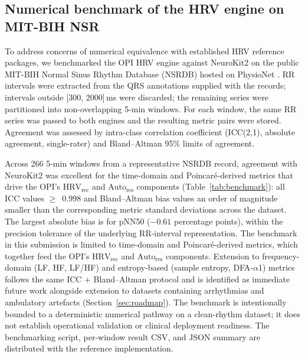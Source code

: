 \documentclass[10pt,journal,twocolumn,compsoc]{IEEEtran}
\begin{document}
\subsection{Numerical benchmark of the HRV engine on MIT-BIH NSR}
\label{sec:benchmark}

To address concerns of numerical equivalence with established HRV reference packages, we benchmarked the OPI HRV engine against NeuroKit2 \cite{makowski2021} on the public MIT-BIH Normal Sinus Rhythm Database (NSRDB) hosted on PhysioNet \cite{goldberger2000}. RR intervals were extracted from the QRS annotations supplied with the records; intervals outside [300, 2000]\,ms were discarded; the remaining series were partitioned into non-overlapping 5-min windows. For each window, the same RR series was passed to both engines and the resulting metric pairs were stored. Agreement was assessed by intra-class correlation coefficient (ICC(2,1), absolute agreement, single-rater) and Bland--Altman 95\% limits of agreement.

Across 266 5-min windows from a representative NSRDB record, agreement with NeuroKit2 was excellent for the time-domain and Poincar\'e-derived metrics that drive the OPI's $\mathrm{HRV_{rec}}$ and $\mathrm{Auto_{res}}$ components (Table~\ref{tab:benchmark}): all ICC values $\geq$~0.998 and Bland--Altman bias values an order of magnitude smaller than the corresponding metric standard deviations across the dataset. The largest absolute bias is for pNN50 ($-0.61$ percentage points), within the precision tolerance of the underlying RR-interval representation. The benchmark in this submission is limited to time-domain and Poincar\'e-derived metrics, which together feed the OPI's $\mathrm{HRV_{rec}}$ and $\mathrm{Auto_{res}}$ components. Extension to frequency-domain (LF, HF, LF/HF) and entropy-based (sample entropy, DFA-$\alpha$1) metrics follows the same ICC + Bland--Altman protocol and is identified as immediate future work alongside extension to datasets containing arrhythmias and ambulatory artefacts (Section~\ref{sec:roadmap}). The benchmark is intentionally bounded to a deterministic numerical pathway on a clean-rhythm dataset; it does not establish operational validation or clinical deployment readiness. The benchmarking script, per-window result CSV, and JSON summary are distributed with the reference implementation.
\end{document}
